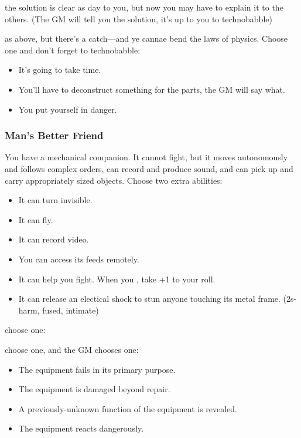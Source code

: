 {the solution is clear as day to you, but now you may have to explain it to the others. (The GM will tell you the solution, it's up to you to technobabble)}
{as above, but there's a catch---and ye cannae bend the laws of physics. Choose one and don't forget to technobabble:
\begin{itemize}
\item It's going to take time.
\item You’ll have to deconstruct something for the parts, the GM will say what.
\item You put yourself in danger.
\end{itemize}}


\subsubsection{Man's Better Friend}
You have a mechanical companion. It cannot fight, but it moves autonomously and follows complex orders, can record and produce sound, and can pick up and carry appropriately sized objects. Choose two extra abilities:
\begin{itemize}
\item It can turn invisible.
\item It can fly.
\item It can record video.
\item You can access its feeds remotely.
\item It can help you fight. When you , take +1 to your roll.
\item It can release an electical shock to stun anyone touching its metal frame. (2s-harm, fused, intimate)
\end{itemize}

{choose one:}
{choose one, and the GM chooses one:
\begin{itemize}
\item The equipment fails in its primary purpose.
\item The equipment is damaged beyond repair.
\item A previously-unknown function of the equipment is revealed.
\item The equipment reacts dangerously.
\end{itemize}}

